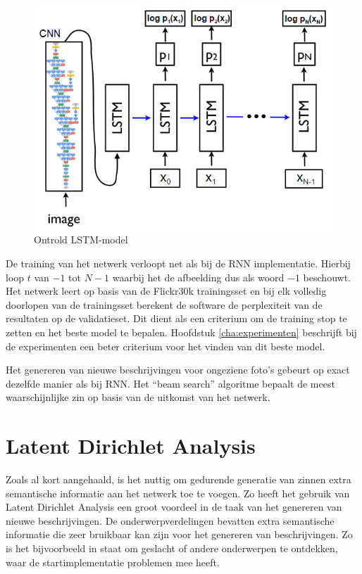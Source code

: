 \begin{figure}[tb]
	\centering
	\includegraphics[width=1\linewidth]{Images/vinyals_karpathy.PNG}
	\caption{Ontrold LSTM-model}
	\label{fig:vinyals:karpathy}
\end{figure}

De training van het netwerk verloopt net als bij de RNN implementatie. Hierbij loop $t$ van $-1$ tot $N-1$ waarbij het de afbeelding dus als woord $-1$ beschouwt. Het netwerk leert op basis van de Flickr30k trainingsset en bij elk volledig doorlopen van de trainingsset berekent de software de perplexiteit van de resultaten op de validatieset. Dit dient als een criterium om de training stop te zetten en het beste model te bepalen. Hoofdstuk \ref{cha:experimenten} beschrijft bij de experimenten een beter criterium voor het vinden van dit beste model.


Het genereren van nieuwe beschrijvingen voor ongeziene foto's gebeurt op exact dezelfde manier als bij RNN. Het ``beam search'' algoritme bepaalt de meest waarschijnlijke zin op basis van de uitkomst van het netwerk.


\section{Latent Dirichlet Analysis}
\label{sec:LDAglobal}
Zoals al kort aangehaald, is het nuttig om gedurende generatie van zinnen extra semantische informatie aan het netwerk toe te voegen.
Zo heeft het gebruik van Latent Dirichlet Analysis een groot voordeel in de taak van het genereren van nieuwe beschrijvingen. De onderwerpverdelingen bevatten extra semantische informatie die zeer bruikbaar kan zijn voor het genereren van beschrijvingen. Zo is het bijvoorbeeld in staat om geslacht of andere onderwerpen te ontdekken, waar de startimplementatie problemen mee heeft.

